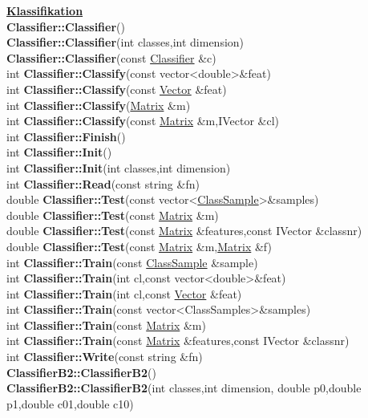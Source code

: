 \documentclass[10pt,titlepage]{article}
\newcommand{\subtitle}[1]{{\noindent\bf#1}}
\def\functionlistentry#1#2#3#4#5#6{\noindent #1 {\bf #2}(#3) \dotfill #6\\}
\begin{document}
{{\subtitle{\hyperlink{SECTION:classification}{Klassifikation}}\\
\functionlistentry{}{Classifier::Classifier}{}{942}{classification}{}
\functionlistentry{}{Classifier::Classifier}{int classes,int dimension}{943}{classification}{}
\functionlistentry{}{Classifier::Classifier}{const \hyperlink{Classifier}{Classifier} \&c}{944}{classification}{}
\functionlistentry{int}{Classifier::Classify}{const vector\textless {}double\textgreater  \&feat}{958}{classification}{}
\functionlistentry{int}{Classifier::Classify}{const \hyperlink{Vector}{Vector} \&feat}{959}{classification}{}
\functionlistentry{int}{Classifier::Classify}{\hyperlink{Matrix}{Matrix} \&m}{960}{classification}{}
\functionlistentry{int}{Classifier::Classify}{const \hyperlink{Matrix}{Matrix} \&m,IVector \&cl}{961}{classification}{}
\functionlistentry{int}{Classifier::Finish}{}{953}{classification}{}
\functionlistentry{int}{Classifier::Init}{}{945}{classification}{}
\functionlistentry{int}{Classifier::Init}{int classes,int dimension}{946}{classification}{}
\functionlistentry{int}{Classifier::Read}{const string \&fn}{963}{classification}{}
\functionlistentry{double}{Classifier::Test}{const vector\textless {}\hyperlink{ClassSample}{ClassSample}\textgreater  \&samples}{954}{classification}{}
\functionlistentry{double}{Classifier::Test}{const \hyperlink{Matrix}{Matrix} \&m}{955}{classification}{}
\functionlistentry{double}{Classifier::Test}{const \hyperlink{Matrix}{Matrix} \&features,const IVector \&classnr}{956}{classification}{}
\functionlistentry{double}{Classifier::Test}{const \hyperlink{Matrix}{Matrix} \&m,\hyperlink{Matrix}{Matrix} \&f}{957}{classification}{}
\functionlistentry{int}{Classifier::Train}{const \hyperlink{ClassSample}{ClassSample} \&sample}{947}{classification}{}
\functionlistentry{int}{Classifier::Train}{int cl,const vector\textless {}double\textgreater  \&feat}{948}{classification}{}
\functionlistentry{int}{Classifier::Train}{int cl,const \hyperlink{Vector}{Vector} \&feat}{949}{classification}{}
\functionlistentry{int}{Classifier::Train}{const vector\textless {}ClassSamples\textgreater  \&samples}{950}{classification}{}
\functionlistentry{int}{Classifier::Train}{const \hyperlink{Matrix}{Matrix} \&m}{951}{classification}{}
\functionlistentry{int}{Classifier::Train}{const \hyperlink{Matrix}{Matrix} \&features,const IVector \&classnr}{952}{classification}{}
\functionlistentry{int}{Classifier::Write}{const string \&fn}{962}{classification}{}
\functionlistentry{}{ClassifierB2::ClassifierB2}{}{978}{classification}{}
\functionlistentry{}{ClassifierB2::ClassifierB2}{int classes,int dimension, double p0,double p1,double c01,double c10}{979}{classification}{}
}}
\end{document}
